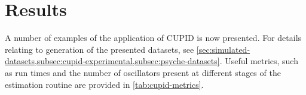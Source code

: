\section{Results}
\label{subsec:cupid-results}

A number of examples of the application of \ac{CUPID} is now presented.
For details relating to generation of the presented datasets, see
\cref{sec:simulated-datasets,subsec:cupid-experimental,subsec:psyche-datasets}.
Useful metrics, such as run times and the number of oscillators present at
different stages of the estimation routine are provided in
\cref{tab:cupid-metrics}.

